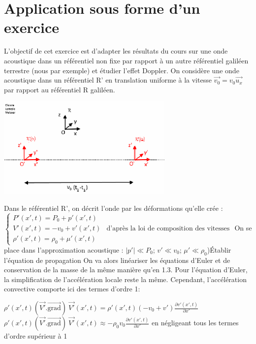 \documentclass[a4paper, 12pt]{article}
\begin{document}
\section{Application sous forme d'un exercice}
L'objectif de cet exercice est d'adapter les résultats du cours sur une onde acoustique dans un référentiel non fixe par rapport à un autre référentiel galiléen terrestre (nous par exemple) et étudier l'effet Doppler.\newline
On considère une onde acoustique dans un référentiel R' en translation uniforme à la vitesse $\vec{v_0}=v_0\vec{u_x}$ par rapport au référentiel R galiléen.
\begin{center}
{\includegraphics[height=5cm]{exo.eps}}
\end{center}
Dans le référentiel R', on décrit l'onde par les déformations qu'elle crée :\newline
$\begin{cases}
P'(x',t)=P_0+p'(x',t) \\
V'(x',t)=-v_0+v'(x',t) &\text{d'après la loi de composition des vitesses} \\
\rho'(x',t)=\rho_0+\mu'(x',t)
\end{cases}$\newline \newline
On se place dans l'approximation acoustique : $|p'|\ll P_0$; $v'\ll v_0$; $\mu'\ll \rho_0$)Établir l'équation de propagation\newline \newline
On va alors linéariser les équations d'Euler et de conservation de la masse de la même manière qu'en 1.3. Pour l'équation d'Euler, la simplification de l'accélération locale reste la même. Cependant, l'accélération convective comporte ici des termes d'ordre 1:
\begin{center}
$\rho'(x',t)(\vec{V'}.\overrightarrow{\textrm{grad}})\:\vec{V'}(x',t)=\rho'(x',t)(-v_0+v')\frac{\partial v'(x',t)}{\partial x'}$\newline
$\rho'(x',t)(\vec{V'}.\overrightarrow{\textrm{grad}})\:\vec{V'}(x',t)\approx -\rho_0v_0\frac{\partial v'(x',t)}{\partial x'}$ en négligeant tous les termes d'ordre supérieur à 1
\end{center}
\end{document}
